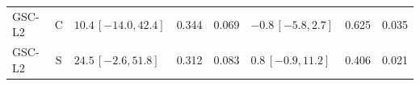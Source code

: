 \begin{longtable}{lcp{37mm}rrp{37mm}rr}
GSC-L2 & C & \(10.4\,[-14.0,42.4]\) & 0.344 & 0.069 & \(-0.8\,[-5.8,2.7]\) & 0.625 & 0.035\\
GSC-L2 & S & \(24.5\,[-2.6,51.8]\) & 0.312 & 0.083 & \(0.8\,[-0.9,11.2]\) & 0.406 & 0.021\\

\end{longtable}

